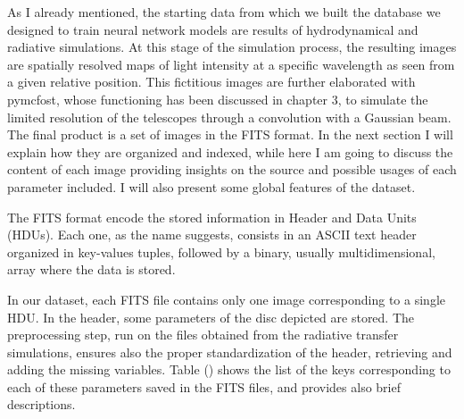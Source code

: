 \documentclass[a4paper,10pt]{report}
\begin{document}
As I already mentioned, the starting data from which we built the database 
we designed to train neural network models are results
of hydrodynamical and radiative simulations.
At this stage of the simulation process, the resulting images
are spatially resolved maps of light intensity at a specific wavelength as seen 
from a given relative position.
This fictitious images are further elaborated with pymcfost,
whose functioning has been discussed in chapter 3, to simulate the limited resolution of
the telescopes through a convolution with a Gaussian beam.
The final product is a set of images in the FITS format. In the next section I will explain how they are organized
and indexed, while here I am going to discuss the content of each image providing insights on the source and
possible usages of each parameter included. I will also present some global features of the dataset.

The FITS format encode the stored information in Header and Data Units (HDUs).
Each one, as the name suggests, consists in an ASCII text header organized in key-values tuples, followed 
by a binary, usually multidimensional, array where the data is stored.

In our dataset, each FITS file contains only one image corresponding to a single HDU.
In the header, some parameters of the disc depicted are stored. 
The preprocessing step, run on the files obtained from the radiative transfer simulations, ensures also
the proper standardization of the header, retrieving and adding the missing variables.
Table () shows the list of the keys corresponding to each of these parameters
saved in the FITS files, and provides also brief descriptions.
\end{document}

